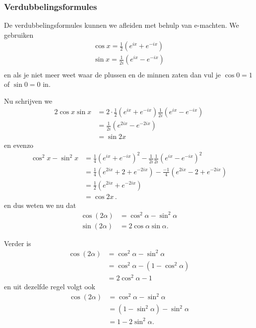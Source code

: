 \subsubsection{Verdubbelingsformules}

De verdubbelingsformules kunnen we afleiden met behulp van e-machten.
We gebruiken
\begin{align*}
    \cos x = \frac 1 2 \left( e^{ix} + e^{-ix} \right) \\
    \sin x = \frac 1 {2i} \left( e^{ix} - e^{-ix} \right) \\
\end{align*}
en als je niet meer weet waar de plussen en de minnen zaten dan vul je $\cos 0 = 1$ of $\sin 0 = 0$ in.

Nu schrijven we
\begin{align*}
    2 \cos x \sin x &= 2 \cdot \frac 1 2 \left( e^{i x} + e^{-ix} \right) \frac 1 {2i} \left( e^{ix} - e^{-ix} \right) \\
    &= \frac 1 {2i} \left(e^{2 i x} - e^{-2ix} \right) \\
    &= \sin 2 x
\end{align*}
en evenzo
\begin{align*}
    \cos^2 x - \sin^2 x &= \frac 1 4 \left( e^{ix} + e^{-ix} \right)^2 - \frac 1 {2i} \frac 1 {2i} \left( e^{ix} - e^{-ix} \right)^2 \\
    &= \frac 1 4 \left( e^{2ix} + 2 + e^{-2ix} \right) - \frac {-1} {4} \left( e^{2ix} - 2 + e^{-2ix} \right) \\
    &= \frac {1} {2} \left( e^{2ix} + e^{-2ix} \right) \\
    &= \cos 2x \,.
\end{align*}
en dus weten we nu dat
\begin{align}
    \label{verdubbeling1}
    \cos (2\alpha) &= \cos^2 \alpha - \sin^2 \alpha \\
    \sin (2\alpha) &= 2 \cos \alpha \sin \alpha. \label{verdubbeling2}
\end{align}


Verder is
\begin{align*}
    \cos (2 \alpha) &= \cos^2 \alpha - \sin^2 \alpha \\
    &= \cos^2 \alpha - (1 - \cos^2 \alpha ) \\
    &= 2  \cos^2 \alpha - 1
\end{align*}
en uit dezelfde regel volgt ook
\begin{align*}
    \cos (2 \alpha) &= \cos^2 \alpha - \sin^2 \alpha \\
    &= (1 - \sin^2 \alpha) - \sin^2 \alpha \\
    &= 1 - 2 \sin^2 \alpha .
\end{align*}

